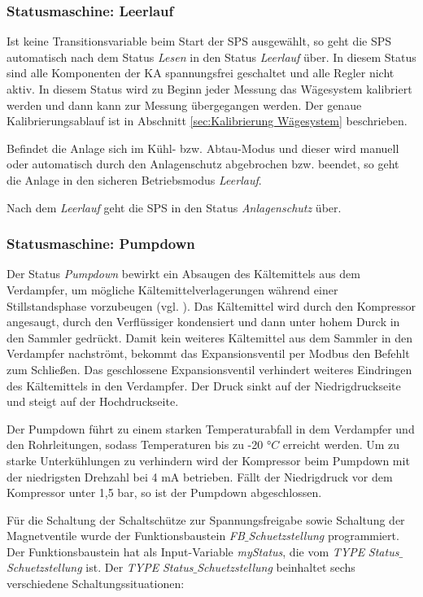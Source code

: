 \subsubsection*{Statusmaschine: Leerlauf}

Ist keine Transitionsvariable beim Start der SPS ausgewählt, so geht die SPS automatisch nach dem Status \textit{Lesen} in den Status \textit{Leerlauf} über. In diesem Status sind alle Komponenten der KA spannungsfrei geschaltet und alle Regler nicht aktiv. In diesem Status wird zu Beginn jeder Messung das Wägesystem kalibriert werden und dann kann zur Messung übergegangen werden. Der genaue Kalibrierungsablauf ist in Abschnitt  \ref{sec:Kalibrierung Wägesystem} beschrieben. 

Befindet die Anlage sich im Kühl- bzw. Abtau-Modus und dieser wird manuell oder automatisch durch den Anlagenschutz abgebrochen bzw. beendet, so geht die Anlage in den sicheren Betriebsmodus \textit{Leerlauf}.  

Nach dem \textit{Leerlauf} geht die SPS in den Status \textit{Anlagenschutz} über.  

\subsubsection*{Statusmaschine: Pumpdown}

Der Status \textit{Pumpdown} bewirkt ein Absaugen des Kältemittels aus dem Verdampfer, um mögliche Kältemittelverlagerungen während einer Stillstandsphase vorzubeugen (vgl. \citep{Siemens2007a}).  Das Kältemittel wird durch den Kompressor angesaugt, durch den Verflüssiger kondensiert und dann unter hohem Durck in den Sammler gedrückt. Damit kein weiteres Kältemittel aus dem Sammler in den Verdampfer nachströmt, bekommt das Expansionsventil per Modbus den Befehlt zum Schließen. Das geschlossene Expansionsventil verhindert weiteres Eindringen des Kältemittels in den Verdampfer. Der Druck sinkt auf der Niedrigdruckseite und steigt auf der Hochdruckseite. 

Der Pumpdown führt zu einem starken Temperaturabfall in dem Verdampfer und den Rohrleitungen, sodass Temperaturen bis zu -20 $°C$ erreicht werden. Um zu starke Unterkühlungen zu verhindern wird der Kompressor beim Pumpdown mit der niedrigsten Drehzahl bei 4 mA betrieben. Fällt der Niedrigdruck vor dem Kompressor unter 1,5  bar, so ist der Pumpdown abgeschlossen.

Für die Schaltung der Schaltschütze zur Spannungsfreigabe sowie Schaltung der Magnetventile wurde der Funktionsbaustein \textit{FB$\_$Schuetzstellung} programmiert. Der Funktionsbaustein hat als Input-Variable \textit{myStatus}, die vom \textit{TYPE}  \textit{Status$\_$Schuetzstellung} ist. Der \textit{TYPE}  \textit{Status$\_$Schuetzstellung} beinhaltet sechs verschiedene Schaltungssituationen:

